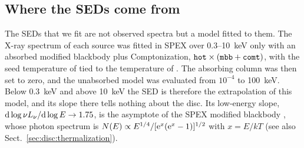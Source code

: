 \subsection{Where the SEDs come from}
\label{sec:fitting:data}

The SEDs that we fit are not observed spectra but a model fitted to them.
The X-ray spectrum of each source was fitted in SPEX over 0.3--10~keV only with an absorbed modified blackbody plus Comptonization, $\texttt{hot} \times (\texttt{mbb} + \texttt{comt})$, with the seed temperature of  tied to the temperature of .
The absorbing column was then set to zero, and the unabsorbed model was evaluated from $10^{-4}$ to 100~keV.
Below 0.3~keV and above 10~keV the SED is therefore the extrapolation of this model, and its slope there tells nothing about the disc.
Its low-energy slope, ${\rm d}\log\nu L_\nu/{\rm d}\log E \to 1.75$, is the asymptote of the SPEX modified blackbody \citep{KaastraBarr1989}, whose photon spectrum is $N(E) \propto E^{1/4}/[{\rm e}^{x}({\rm e}^{x} - 1)]^{1/2}$ with $x = E/kT$ (see also Sect.~\ref{sec:disc:thermalization}).


